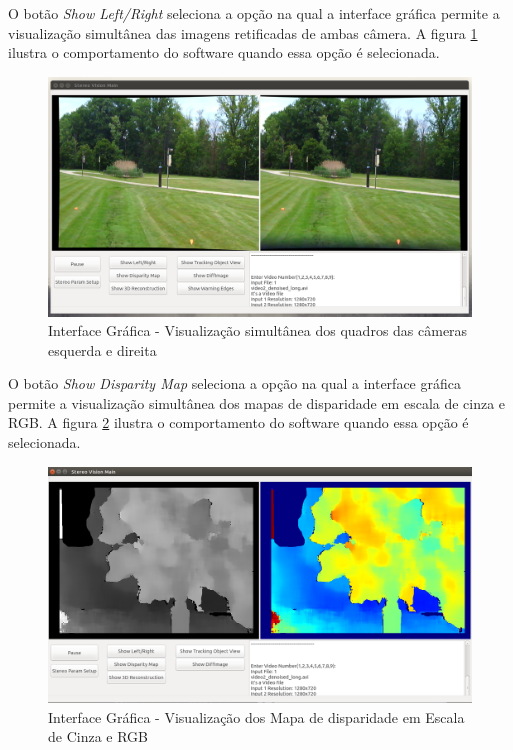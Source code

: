 O botão \textit{Show Left/Right} seleciona a opção na qual a interface gráfica permite a visualização simultânea das imagens retificadas de ambas câmera. A figura \ref{gui_showleftright_view} 
ilustra o comportamento do software quando essa opção é selecionada. 

\begin{figure}[H]
 	\centering
 	\includegraphics[scale=0.35]{./Resources/gui_showleftright_view.png}
 	\caption{Interface Gráfica - Visualização simultânea dos quadros das câmeras esquerda e direita}
 	\label{gui_showleftright_view}
\end{figure}

O botão \textit{Show Disparity Map} seleciona a opção na qual a interface gráfica permite a visualização simultânea dos mapas de disparidade em escala de cinza e RGB. A figura 
\ref{gui_showdisparitymap_view} ilustra o comportamento do software quando essa opção é selecionada. 

\begin{figure}[H]
 	\centering
 	\includegraphics[scale=0.35]{./Resources/gui_showdisparitymap_view.png}
 	\caption{Interface Gráfica - Visualização dos Mapa de disparidade em Escala de Cinza e RGB}
 	\label{gui_showdisparitymap_view}
\end{figure}


